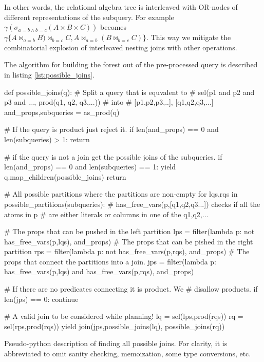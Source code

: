 In other words, the relational algebra tree is interleaved with
OR-nodes of different representations of the subquery. For example
\(\gamma(\sigma_{a=b \land b=c}(A \times B \times C))\) becomes
\(\gamma\{A \Join_{a=b} B) \Join_{b=c} C, A \Join_{a=b} (B \Join_{b=c}
C)\}\). This way we mitigate the combinatorial explosion of interleaved
nesting joins with other operations.

The algorithm for building the forest out of the pre-processed query
is described in listing \ref{lst:possible_joins}.

\begin{code}
  \begin{pycode}
    def possible_joins(q):
        # Split a query that is equvalent to
        # sel(p1 and p2 and p3 and ..., prod(q1, q2, q3,...))
        # into
        # [p1,p2,p3,..], [q1,q2,q3,...]
        and_props,subqueries =  as_prod(q)

        # If the query is product just reject it.
        if len(and_props) == 0 and len(subqueries) > 1:
            return

        # if the query is not a join get the possible joins of the subqueries.
        if len(and_props) == 0 and len(subqueries) == 1:
            yield q.map_children(possible_joins)
            return

        # All possible partitions where the partitions are non-empty
        for lqs,rqs in possible_partitions(subqueries):
            # has_free_vars(p,[q1,q2,q3...]) checks if all the atoms in p
            # are either literals or columns in one of the q1,q2,...

            # The props that can be pushed in the left partition
            lps = filter(lambda p: not has_free_vars(p,lqs), and_props)
            # The props that can be pished in the right partition
            rps = filter(lambda p: not has_free_vars(p,rqs), and_props)
            # The props that connect the partitions into a join.
            jps = filter(lambda p: has_free_vars(p,lqs)
                         and has_free_vars(p,rqs),
                         and_props)

            # If there are no predicates connecting it is product. We
            # disallow products.
            if len(jps) == 0: continue

            # A valid join to be considered while planning!
            lq = sel(lps,prod(rqs))
            rq = sel(rps,prod(rqs))
            yield join(jps,possible_joins(lq), possible_joins(rq))
  \end{pycode}
  \caption{\label{lst:possible_joins} Pseudo-python description of
    finding all possible joins. For clarity, it is abbreviated to omit sanity
    checking, memoization, some type conversions, etc.}
\end{code}

